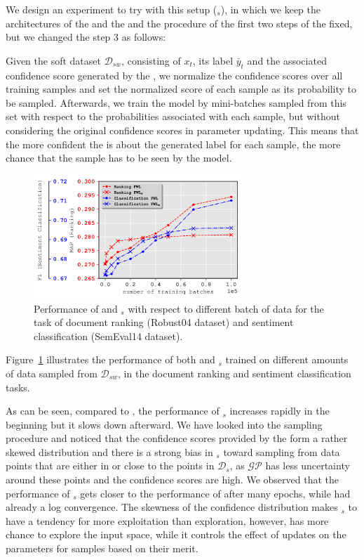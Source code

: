 We design an experiment to try \fwl with this setup (\fwlnospace$_s$), in which we keep the architectures of the \std and the \tch and the procedure of the  first two steps of the \fwl fixed, but we changed the step 3 as follows:

Given the soft dataset $\mathcal{D}_{sw}$, consisting of $x_t$, its label $\bar{y}_t$ and the associated confidence score generated by the \tch, we normalize the confidence scores over all training samples and set the normalized score of each sample as its probability to be sampled. 
Afterwards, we train the \std model by mini-batches sampled from this set with respect to the probabilities associated with each sample, but without considering the original confidence scores in parameter updating.
This means that the more confident the \tch is about the generated label for each sample, the more chance that the sample has to be seen by the \std model.
\begin{figure}[t]
    \centering
    \includegraphics[width=0.7\textwidth]{03-part-02/chapter-05/figs_and_tables/plot_sampling_fwl.png}
    \caption{Performance of \fwl and \fwlnospace$_s$ with respect to different batch of data for the task of document ranking (Robust04 dataset) and sentiment classification (SemEval14 dataset).}
    \label{fig:sampling}
\end{figure}
Figure~\ref{fig:sampling} illustrates the performance of both \fwl and \fwlnospace$_s$ trained on different amounts of data sampled from $\mathcal{D}_{sw}$, in the document ranking and sentiment classification tasks. 

As can be seen, compared to \fwl, the performance of \fwlnospace$_s$ increases rapidly in the beginning but it slows down afterward. 
We have looked into the sampling procedure and noticed that the confidence scores provided by the \tch form a rather skewed distribution and there is a strong bias in \fwlnospace$_s$ toward sampling from data points that are either in or close to the points in $\mathcal{D}_{s}$, as $\mathcal{GP}$ has less uncertainty around these points and the confidence scores are high.
We observed that the performance of \fwlnospace$_s$ gets closer to the performance of \fwl after many epochs, while \fwl had already a log convergence.
%
The skewness of the confidence distribution makes \fwlnospace$_s$ to have a tendency for more exploitation than exploration, however, \fwl has more chance to explore the input space, while it controls the effect of updates on the parameters for samples based on their merit. 